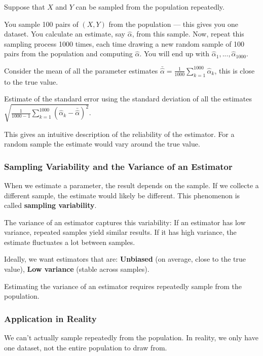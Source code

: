 Suppose that $X$ and $Y$ can be sampled from the population repeatedly. 

You sample 100 pairs of $(X,Y)$ from the population — this gives you one dataset. You calculate an estimate, say $\widehat{\alpha}$, from this sample. Now, repeat this sampling process 1000 times, each time drawing a new random sample of 100 pairs from the population and computing $\widehat{\alpha}$. You will end up with $\widehat{\alpha}_1,...,\widehat{\alpha}_{1000}$.

\bigskip

Consider the mean of all the parameter estimates $\bar{\widehat{\alpha}} = \frac{1}{1000}\sum_{k=1}^{1000} \widehat{\alpha}_k$, this is close to the true value.

Estimate of the standard error using the standard deviation of all the estimates $\sqrt{\frac{1}{1000-1}\sum_{k=1}^{1000}(\widehat{\alpha}_k - \bar{\widehat{\alpha}})^2}$.

This gives an intuitive description of the reliability of the estimator. For a random sample the estimate would vary around the true value.

\subsubsection{Sampling Variability and the Variance of an Estimator}

\indent 

When we estimate a parameter, the result depends on the sample. If we collecte a different sample, the estimate would likely be different. This phenomenon is called \textbf{sampling variability}.

The variance of an estimator captures this variability: If an estimator has low variance, repeated samples yield similar results. If it has high variance, the estimate fluctuates a lot between samples.

Ideally, we want estimators that are: \textbf{Unbiased} (on average, close to the true value), \textbf{Low variance} (stable across samples).

Estimating the variance of an estimator requires repeatedly sample from the population.

\subsubsection{Application in Reality}

\indent 

We can’t actually sample repeatedly from the population. In reality, we only have one dataset, not the entire population to draw from.

